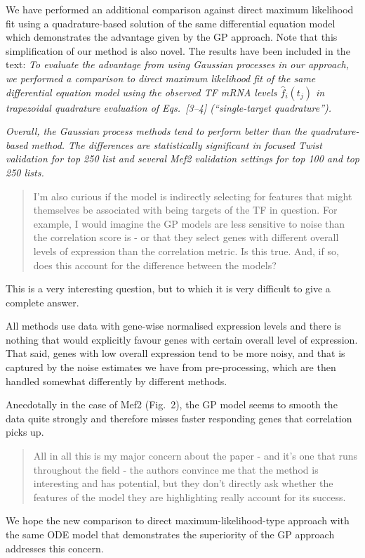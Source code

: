 \documentclass{article}
\begin{document}
We have performed an additional comparison against direct maximum
likelihood fit using a quadrature-based solution of the same
differential equation model which demonstrates the advantage given
by the GP approach.  Note that this simplification of our method is
also novel.  The results have been included in the text:
\emph{To evaluate the advantage from using Gaussian processes in our
approach, we performed a comparison to direct maximum likelihood fit
of the same differential equation model using the observed TF mRNA
levels $\hat{f}_i(t_j)$ in trapezoidal quadrature evaluation of
Eqs.~[3--4]
(``single-target quadrature'').}

\emph{Overall, the Gaussian process methods tend to perform better than the
quadrature-based method. The differences are statistically significant
in focused Twist validation for top 250 list and several Mef2 validation
settings for top 100 and top 250 lists.}

\begin{quote} I'm also curious if the model is indirectly
    selecting for features that might themselves be associated with
    being targets of the TF in question. For example, I would imagine
    the GP models are less sensitive to noise than the correlation
    score is - or that they select genes with different overall levels
    of expression than the correlation metric. Is this true. And, if
    so, does this account for the difference between the models?
\end{quote}

This is a very interesting question, but to which it is very difficult
to give a complete answer.

All methods use data with gene-wise normalised expression levels and
there is nothing that would explicitly favour genes with certain
overall level of expression.  That said, genes with low overall
expression tend to be more noisy, and that is captured by the noise
estimates we have from pre-processing, which are then handled somewhat
differently by different methods.

Anecdotally in the case of Mef2 (Fig.~2), the GP model seems to smooth
the data quite strongly and therefore misses faster responding genes
that correlation picks up.


\begin{quote} All in all this is my major concern about the
    paper - and it's one that runs throughout the field - the authors
    convince me that the method is interesting and has potential, but
    they don't directly ask whether the features of the model they are
    highlighting really account for its success.
\end{quote}

We hope the new comparison to direct maximum-likelihood-type approach
with the same ODE model that demonstrates the superiority of the GP
approach addresses this concern.

\end{document}
